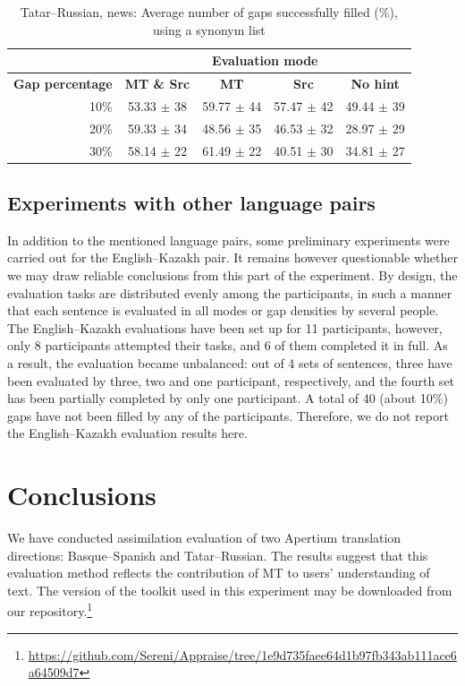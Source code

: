 \documentclass[11pt]{article}
\begin{document}
\begin{table}
\centering
\begin{tabular}{|r |*{4}{c}|}
\hline
  &\multicolumn{4}{c|}{\textbf{Evaluation mode}}\\
\hline
\textbf{Gap percentage} & \textbf{MT \& Src} & \textbf{MT} & \textbf{Src} & \textbf{No hint} \\
\hline
10\%&53.33 \(\pm\) 38&59.77 \(\pm\) 44&57.47 \(\pm\) 42&49.44 \(\pm\) 39\\
20\%&59.33 \(\pm\) 34&48.56 \(\pm\) 35&46.53 \(\pm\) 32&28.97 \(\pm\) 29\\
30\%&58.14 \(\pm\) 22&61.49 \(\pm\) 22&40.51 \(\pm\) 30&34.81 \(\pm\) 27\\
\hline
\end{tabular}
\caption {Tatar--Russian, news: Average number of gaps successfully filled (\%), using a synonym list} 
\label{table:rus-news} 
\end{table}
\subsection{Experiments with other language pairs}
In addition to the mentioned language pairs, some preliminary experiments were carried out for the English--Kazakh pair. It remains however questionable whether we may draw reliable conclusions from this part of the experiment. By design, the evaluation tasks are distributed evenly among the participants, in such a manner that each sentence is evaluated in all modes or gap densities by several people. The English--Kazakh evaluations have been set up for 11 participants, however, only 8 participants attempted their tasks, and 6 of them completed it in full. As a result, the evaluation became unbalanced: out of 4 sets of sentences, three have been evaluated by three, two and one participant, respectively, and the fourth set has been partially completed by only one participant. A total of 40 (about 10\%) gaps have not been filled by any of the participants. Therefore, we do not report the English--Kazakh evaluation results here.


\section{Conclusions}
\label{sec:conclusion}
We have conducted assimilation evaluation of two Apertium translation directions: Basque--Spanish and Tatar--Russian. The results suggest that this evaluation method reflects the contribution of MT to users' understanding of text. The version of the toolkit used in this 
experiment may be downloaded from our repository.\footnote{{\url{https://github.com/Sereni/Appraise/tree/1e9d735faee64d1b97fb343ab111ace6a64509d7}}}
\end{document}
